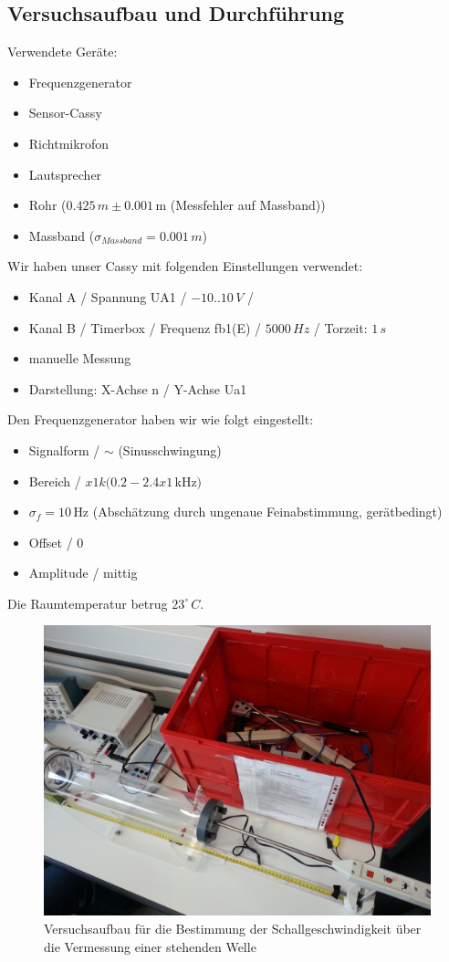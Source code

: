\documentclass[12pt,a4paper]{article}
\begin{document}
\subsection{Versuchsaufbau und Durchführung}
Verwendete Geräte:
\begin{itemize}
\item Frequenzgenerator
\item Sensor-Cassy
\item Richtmikrofon
\item Lautsprecher
\item Rohr ($0.425\, m \pm 0.001\,$m (Messfehler auf Massband))
\item Massband ($\sigma_{Massband} = 0.001\, m$)
\end{itemize}
Wir haben unser Cassy mit folgenden Einstellungen verwendet:
\begin{itemize}
\item Kanal A / Spannung UA1 / $-10..10\, V$ /
\item Kanal B / Timerbox / Frequenz fb1(E) / $5000\, Hz$ / Torzeit: $1\, s$
\item manuelle Messung
\item Darstellung: X-Achse n / Y-Achse Ua1
\end{itemize}
Den Frequenzgenerator haben wir wie folgt eingestellt:
\begin{itemize}
\item Signalform / $\sim$ (Sinusschwingung)
\item Bereich / $x1k (0.2 - 2.4 x 1\, $kHz$)$
\item $\sigma_f = 10\,$Hz (Abschätzung durch ungenaue Feinabstimmung, gerätbedingt)
\item Offset / 0
\item Amplitude / mittig
\end{itemize}
Die Raumtemperatur betrug $23^{\circ}\, C$.
\begin{figure}[H]
\centering
\includegraphics[scale=0.1]{Bilder/Druckknoten-Messung3.jpg}
\caption{Versuchsaufbau für die Bestimmung der Schallgeschwindigkeit über die Vermessung einer stehenden Welle}
\end{figure}
\end{document}

